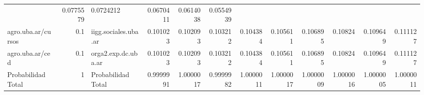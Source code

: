 \begin{table}
\begin{tabular}{|l||r||l||r|r|r|r|r|r|r|r|r|}
        & 0.0775579& 0.0724212& 0.0670411& 0.0614038& 0.0554939\\
        agro.uba.ar/cursos& 0.1&
        iigg.sociales.uba.ar& 0.101023& 0.102093 & 0.103212 & 0.104384
        & 0.105611 & 0.106895 & 0.10824& 0.109649 & 0.111127\\
        agro.uba.ar/ced& 0.1&
        orga2.exp.dc.uba.ar& 0.101023& 0.102093 & 0.103212 & 0.104384
        & 0.105611 & 0.106895 & 0.10824& 0.109649 & 0.111127\\
        \hline
        Probabilidad Total& 1&
        Probabilidad Total& 0.9999991& 1.0000017& 0.9999982& 1.0000011&
        1.0000017& 1.0000009& 1.0000016& 1.0000005& 1.0000011\\
        \hline\hline
    \end{tabular}
\end{table}
